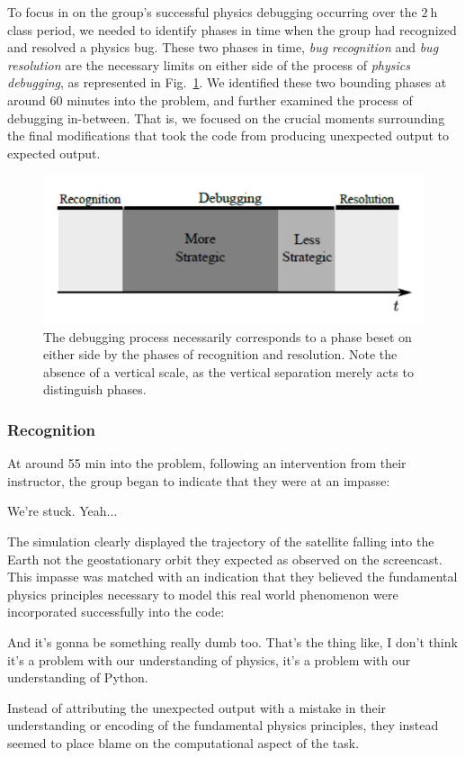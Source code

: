 \documentclass{msuphddissertation}
\begin{document}
\begin{doublespace}
To focus in on the group's successful physics debugging occurring over the $\SI{2}{\hour}$ class period, we needed to identify phases in time when the group had recognized and resolved a physics bug.  These two phases in time, \emph{bug recognition} and \emph{bug resolution} are the necessary limits on either side of the process of \emph{physics debugging}, as represented in Fig.~\ref{CH4:Strategies}.  We identified these two bounding phases at around 60 minutes into the problem, and further examined the process of debugging in-between.  That is, we focused on the crucial moments surrounding the final modifications that took the code from producing unexpected output to expected output.

\begin{figure}\centering
\includegraphics[scale=1]{./images/CH4Strategies.pdf}
\caption{The debugging process necessarily corresponds to a phase beset on either side by the phases of recognition and resolution.  Note the absence of a vertical scale, as the vertical separation merely acts to distinguish phases.}\label{CH4:Strategies}
\end{figure}

\subsubsection{Recognition}

At around 55 min into the problem, following an intervention from their instructor, the group began to indicate that they were at an impasse: \begin{description}
\SB We're stuck.
\SD Yeah...\end{description} The simulation clearly displayed the trajectory of the satellite falling into the Earth not the geostationary orbit they expected as observed on the screencast. This impasse was matched with an indication that they believed the fundamental physics principles necessary to model this real world phenomenon were incorporated successfully into the code:\begin{description}
\SB And it's gonna be something really dumb too.
\SA That's the thing like, I don't think it's a problem with our understanding of physics, it's a problem with our understanding of Python.\end{description}  Instead of attributing the unexpected output with a mistake in their understanding or encoding of the fundamental physics principles, they instead seemed to place blame on the computational aspect of the task.


\end{doublespace}
\end{document}

